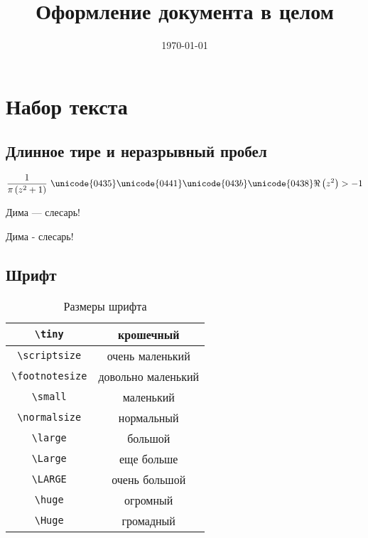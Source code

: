 \documentclass[12pt, a4paper]{article}
\title{Оформление документа в целом}
\date{\today}
\begin{document}

\maketitle

\section{Набор текста}

\subsection{Длинное тире и неразрывный пробел}


\[\frac{1}{\pi  \left(z^2+1\right)}\text{ $\unicode{0435}\unicode{0441}\unicode{043b}\unicode{0438}$}\Re\left(z^2\right)>-1\]

Дима --- слесарь!

Дима - слесарь!


\newpage


\subsection{Шрифт}

\begin{table}[h!]
	\caption{Размеры шрифта}
	\centering
		\begin{tabular}{|c|c|}
		\hline	\verb|\tiny|      & \tiny        крошечный \\
		\hline	\verb|\scriptsize|   & \scriptsize  очень маленький\\
			\hline \verb|\footnotesize| & \footnotesize  довольно маленький \\
			\hline \verb|\small|        &  \small        маленький \\
			\hline \verb|\normalsize|   &  \normalsize  нормальный \\
			\hline \verb|\large|        &  \large       большой \\
			\hline \verb|\Large|        &  \Large       еще больше \\[5pt]
			\hline \verb|\LARGE|        &  \LARGE       очень большой \\[5pt]
			\hline \verb|\huge|         &  \huge        огромный \\[5pt]
			\hline \verb|\Huge|         &  \Huge        громадный \\ \hline
		\end{tabular}
\end{table}
\end{document}
